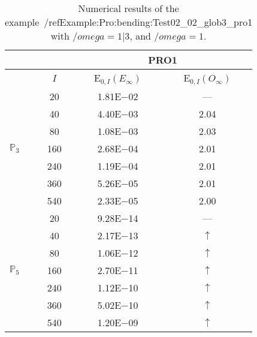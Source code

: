 \begin{table}[H]
\caption{Numerical results of the example~/ref{Example:Pro:bending:Test02_02_glob3_pro1} with $/omega=1|3$, and $/omega=1$.}
\setlength{\tabcolsep}{5pt}
\centering
\begin{tabular}{@{}l c c c@{}}
\toprule
 &  & \multicolumn{2}{c}{PRO1}\\
\midrule
 & $I$ & E$_{0,I}(E_{\infty})$ & E$_{0,I}(O_{\infty})$\\
\midrule
\multirow{7}{*}{$\mathbb{P}_{3}$}
 & 20 & 1.81E$-$02 & ---\\
 & 40 & 4.40E$-$03 & 2.04\\
 & 80 & 1.08E$-$03 & 2.03\\
 & 160 & 2.68E$-$04 & 2.01\\
 & 240 & 1.19E$-$04 & 2.01\\
 & 360 & 5.26E$-$05 & 2.01\\
 & 540 & 2.33E$-$05 & 2.00\\
\midrule
\multirow{7}{*}{$\mathbb{P}_{5}$}
 & 20 & 9.28E$-$14 & ---\\
 & 40 & 2.17E$-$13 & $\uparrow$\\
 & 80 & 1.06E$-$12 & $\uparrow$\\
 & 160 & 2.70E$-$11 & $\uparrow$\\
 & 240 & 1.12E$-$10 & $\uparrow$\\
 & 360 & 5.02E$-$10 & $\uparrow$\\
 & 540 & 1.20E$-$09 & $\uparrow$\\
\bottomrule
\end{tabular}
\label{Table:PRO:test_02_02_test10_pro1}
\end{table}
